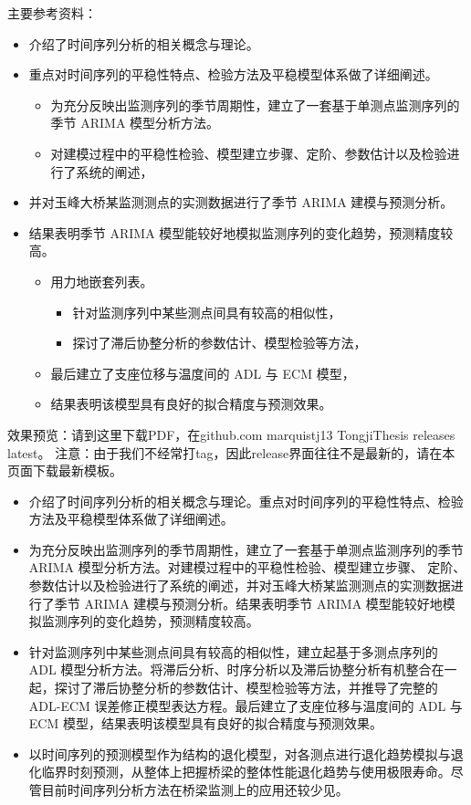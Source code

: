 \documentclass[../Main/thesis]{subfiles}
\begin{document}
主要参考资料：
\begin{itemize}
  \item 介绍了时间序列分析的相关概念与理论。
  \item 重点对时间序列的平稳性特点、检验方法及平稳模型体系做了详细阐述。
  \begin{itemize}
    \item 为充分反映出监测序列的季节周期性，建立了一套基于单测点监测序列的季节 ARIMA 模型分析方法。
    \item 对建模过程中的平稳性检验、模型建立步骤、定阶、参数估计以及检验进行了系统的阐述，
  \end{itemize}
  \item 并对玉峰大桥某监测测点的实测数据进行了季节 ARIMA 建模与预测分析。
  \item 结果表明季节 ARIMA 模型能较好地模拟监测序列的变化趋势，预测精度较高。
  \begin{itemize}
    \item 用力地嵌套列表。
    \begin{itemize}
      \item 针对监测序列中某些测点间具有较高的相似性，
      \item 探讨了滞后协整分析的参数估计、模型检验等方法，
    \end{itemize}
    \item 最后建立了支座位移与温度间的 ADL 与 ECM 模型，
    \item 结果表明该模型具有良好的拟合精度与预测效果。
  \end{itemize}
\end{itemize}


效果预览：请到这里下载PDF，在github.com marquistj13 TongjiThesis releases latest。
注意：由于我们不经常打tag，因此release界面往往不是最新的，请在本页面下载最新模板。


\begin{itemize}
  \item 介绍了时间序列分析的相关概念与理论。重点对时间序列的平稳性特点、检验方法及平稳模型体系做了详细阐述。
  \item 为充分反映出监测序列的季节周期性，建立了一套基于单测点监测序列的季节 ARIMA 模型分析方法。对建模过程中的平稳性检验、模型建立步骤、
  定阶、参数估计以及检验进行了系统的阐述，并对玉峰大桥某监测测点的实测数据进行了季节 ARIMA 建模与预测分析。结果表明季节 ARIMA 模型能较好地模
  拟监测序列的变化趋势，预测精度较高。
  \item 针对监测序列中某些测点间具有较高的相似性，建立起基于多测点序列的 ADL 模型分析方法。将滞后分析、时序分析以及滞后协整分析有机整合在一起，探讨了滞后协整分析的参数估计、模型检验等方法，并推导了完整的 ADL-ECM 误差修正模型表达方程。最后建立了支座位移与温度间的 ADL 与 ECM 模型，结果表明该模型具有良好的拟合精度与预测效果。
  \item 以时间序列的预测模型作为结构的退化模型，对各测点进行退化趋势模拟与退化临界时刻预测，从整体上把握桥梁的整体性能退化趋势与使用极限寿命。尽管目前时间序列分析方法在桥梁监测上的应用还较少见。
\end{itemize}
\end{document}

